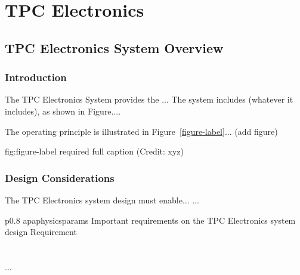 \chapter{TPC Electronics}
\label{ch:fdsp-tpc-elec}

\section{TPC Electronics System Overview}
\label{sec:fdsp-tpc-elec-ov}


\subsection{Introduction}
\label{sec:fdsp-tpc-elec-intro}

The TPC Electronics System provides the ...
The system includes (whatever it includes), as shown in Figure.... 


The operating principle is illustrated in Figure~\ref{figure-label}... (add figure)

\begin{dunefigure}{fig:figure-label}
{required full caption (Credit: xyz)}
\end{dunefigure}

\subsection{Design Considerations}
\label{sec:fdsp-tpc-elec-des-consid}


The TPC Electronics system design must enable... 
...


\begin{dunetable}
{p{0.8\textwidth}}
{apaphysicsparams}
{Important requirements on the TPC Electronics system design}   
Requirement  \\ \toprowrule
  \\ \colhline
   \\ \colhline
 ...\\ 
\end{dunetable}

